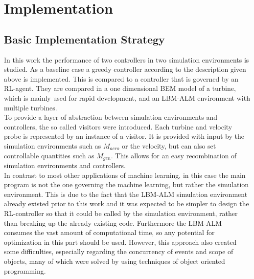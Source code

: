 \section{Implementation}
\subsection{Basic Implementation Strategy}
In this work the performance of two controllers in two simulation environments is studied. As a baseline case a greedy controller according to the description given above is implemented. This is compared to a controller that is governed by an RL-agent. They are compared in a one dimensional BEM model of a turbine, which is mainly used for rapid development, and an LBM-ALM environment with multiple turbines. \\
To provide a layer of abstraction between simulation environments and controllers, the so called visitors were introduced. Each turbine and velocity probe is represented by an instance of a visitor. It is provided with input by the simulation environments such as $M_{aero}$ or the velocity, but can also set controllable quantities such as $M_{gen}$. This allows for an easy recombination of simulation environments and controllers. \\
In contrast to most other applications of machine learning, in this case the main program is not the one governing the machine learning, but rather the simulation environment. This is due to the fact that the LBM-ALM simulation environment already existed prior to this work and it was expected to be simpler to design the RL-controller so that it could be called by the simulation environment, rather than breaking up the already existing code. Furthermore the LBM-ALM consumes the vast amount of computational time, so any potential for optimization in this part should be used. However, this approach also created some difficulties, especially regarding the concurrency of events and scope of objects, many of which were solved by using techniques of object oriented programming.
